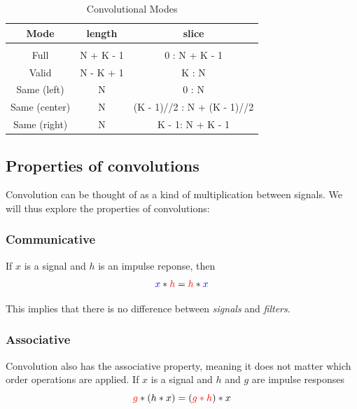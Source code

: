 \documentclass{article}
\begin{document}
\begin{table}[h!]
    \begin{center}
        \caption{Convolutional Modes}
        \label{tab:conv_modes}
        \begin{tabular}{c|c|c}
            \textbf{Mode} & \textbf{length} & \textbf{slice} \\
            \hline \\
            Full & N + K - 1 & 0 : N + K - 1 \\
            Valid & N - K + 1 & K : N \\
            Same (left) & N & 0 : N \\
            Same (center) & N & (K - 1)//2 : N + (K - 1)//2 \\
            Same (right) & N & K - 1: N + K - 1 \\
        \end{tabular}
    \end{center}
\end{table}

\subsection{Properties of convolutions}
Convolution can be thought of as a kind of multiplication between signals. 
We will thus explore the properties of convolutions:

\subsubsection{Communicative}

If $x$ is a signal and $h$ is an impulse reponse, then
\begin{equation}
    \textcolor{blue}{x} * \textcolor{red}{h} = \textcolor{red}{h} * \textcolor{blue}{x}
\end{equation}

This implies that there is no difference between {\it signals} and {\it filters}.

\subsubsection{Associative}

Convolution also has the associative property, meaning it does not matter which
order operations are applied.
If $x$ is a signal and $h$ and $g$ are impulse responses
\begin{equation}
    \textcolor{red}{g} * (h * x) = (\textcolor{red}{g * h}) * x
\end{equation}
\end{document}
